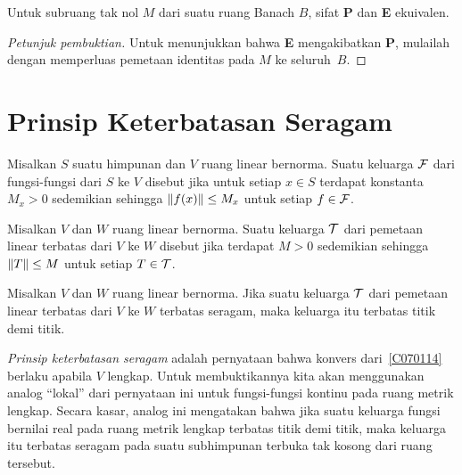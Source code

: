 \begin{prop} Untuk subruang tak nol $M$ dari suatu ruang Banach $B$, sifat \textbf{P} dan \textbf{E} ekuivalen.
\end{prop}

\begin{proof}[\emph{Petunjuk pembuktian}] Untuk menunjukkan bahwa \textbf{E} mengakibatkan \textbf{P}, mulailah dengan memperluas pemetaan identitas
pada $M$ ke seluruh~$B$.   \ns
\end{proof}

















\section{Prinsip Keterbatasan Seragam}
\begin{defn} Misalkan $S$ suatu himpunan dan $V$ ruang linear bernorma. Suatu keluarga $\mathcal{F}$ dari
fungsi-fungsi dari $S$ ke $V$ disebut
 jika untuk setiap $x \in S$ terdapat konstanta $M_x > 0$ sedemikian sehingga
$\lVert f(x)\rVert \le M_x$ untuk setiap $f \in \mathcal{F}$.
\end{defn}

\begin{defn} Misalkan $V$ dan $W$ ruang linear bernorma. Suatu keluarga $\mathcal{T}$ dari pemetaan linear terbatas
dari $V$ ke $W$ disebut
 jika terdapat $M > 0$ sedemikian sehingga $\lVert T\rVert \le M$ untuk setiap $T \in
\mathcal{T}$.
\end{defn}

\begin{exer}\label{C070114} Misalkan $V$ dan $W$ ruang linear bernorma. Jika suatu keluarga $\mathcal{T}$ dari
pemetaan linear terbatas dari $V$ ke $W$ terbatas seragam, maka keluarga itu terbatas titik demi titik.
\end{exer}

\emph{Prinsip keterbatasan seragam} adalah pernyataan bahwa konvers
dari~\ref{C070114} berlaku apabila $V$ lengkap. Untuk membuktikannya kita akan menggunakan
analog ``lokal'' dari pernyataan ini untuk fungsi-fungsi kontinu pada ruang metrik lengkap. Secara kasar, analog ini mengatakan bahwa jika
suatu keluarga fungsi bernilai real pada ruang metrik lengkap terbatas titik demi titik, maka keluarga itu terbatas
seragam pada suatu subhimpunan terbuka tak kosong dari ruang tersebut.

